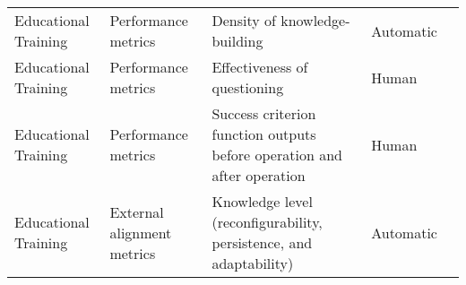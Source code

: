 \begin{small}
\begin{center}
\begin{longtable}{@{}p{}p{}p{}p{}p{}@{}}
Educational Training     & Performance metrics                 & Density of knowledge-building                                                                                                                                                                               & Automatic & \cite{Jin2023TeachAH}                                                                                                                                                                                                                                                                                                                                                                                                  \\
Educational Training     & Performance metrics                 & Effectiveness of questioning                                                                                                                                                                                & Human     & \cite{Shi2023CGMICG}                                                                                                                                                                                                                                                                                                                                                                                                   \\
Educational Training     & Performance metrics                 & Success criterion function outputs before operation and after operation                                                                                                                                     & Human     & \cite{Li2023MetaAgentsSI}                                                                                                                                                                                                                                                                                                                                                                                                  \\
Educational Training     & External alignment metrics          & Knowledge level (reconfigurability, persistence, and adaptability)                                                                                                                                          & Automatic & \cite{Jin2023TeachAH}                                                                                                                                                                                                                                                                                                                                                                                                  \\

\end{longtable}
\end{center}
\end{small}
